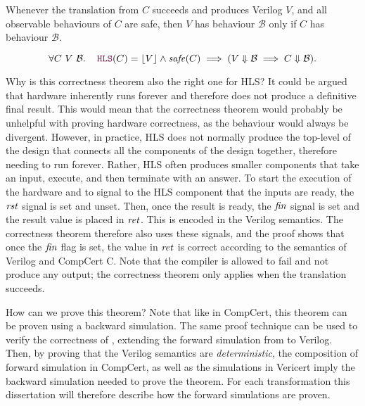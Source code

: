 \begin{theorem}
  Whenever the translation from $C$ succeeds and produces Verilog $V\!$, and all
  observable behaviours of $C$ are safe, then $V\!$ has behaviour $\mathcal{B}$
  only if $C$ has behaviour $\mathcal{B}$.

  {\normalfont\begin{equation*} \forall C\ V\ \mathcal{B}\ldotp\quad \yhfunction{HLS} (C)
      = \ccok{V} \land \mathit{safe}(C) \implies (V \Downarrow \mathcal{B}
      \implies C \Downarrow \mathcal{B}).
  \end{equation*}}
\end{theorem}

Why is this correctness theorem also the right one for HLS?  It could be argued
that hardware inherently runs forever and therefore does not produce a
definitive final result.  This would mean that the \compcert{} correctness
theorem would probably be unhelpful with proving hardware correctness, as the
behaviour would always be divergent.  However, in practice, HLS does not
normally produce the top-level of the design that connects all the components of
the design together, therefore needing to run forever.  Rather, \gls{HLS} often
produces smaller components that take an input, execute, and then terminate with
an answer.  To start the execution of the hardware and to signal to the HLS
component that the inputs are ready, the $\mathit{rst}$ signal is set and unset.
Then, once the result is ready, the $\mathit{fin}$ signal is set and the result
value is placed in $\mathit{ret}$.  This is encoded in the Verilog semantics.  The
correctness theorem therefore also uses these signals, and the proof shows that
once the $\mathit{fin}$ flag is set, the value in $\mathit{ret}$ is correct
according to the semantics of Verilog and CompCert C.  Note that the compiler is
allowed to fail and not produce any output; the correctness theorem only applies
when the translation succeeds.

How can we prove this theorem?  Note that like in CompCert, this theorem can be
proven using a backward simulation.  The same proof technique can be used to
verify the correctness of \vericert{}, extending the forward simulation from
\rtl{} to Verilog.  Then, by proving that the Verilog semantics are
\emph{deterministic}, the composition of forward simulation in CompCert, as well
as the simulations in Vericert imply the backward simulation needed to prove the
theorem.  For each transformation this dissertation will therefore describe how
the forward simulations are proven.


